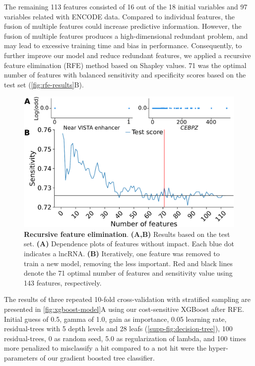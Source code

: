 The remaining 113 features consisted of 16 out of the 18 initial variables\autocite{liu_2017_crispri} and 97 variables related with ENCODE data. Compared to individual features, the fusion of multiple features could increase predictive information. However, the fusion of multiple features produces a high-dimensional redundant problem, and may lead to excessive training time and bias in performance.\autocite{franklin_2005,altman_2018_curse} Consequently, to further improve our model and reduce redundant features, we applied a recursive feature elimination (RFE) method based on Shapley values.\autocite{shapley_SHAP_values} 71 was the optimal number of features with balanced sensitivity and specificity scores based on the test set (\autoref{fig:rfe-results}B). 

\begin{figure}[ht!]
  \centering
  \includegraphics[scale=0.4]{plots/results/ml/rfe.not.important.features.pdf}
  \caption[Recursive feature elimination]{\textbf{Recursive feature elimination}. \textbf{(A,B)} Results based on the test set. \textbf{(A)} Dependence plots of features without impact. Each blue dot indicates a lncRNA. \textbf{(B)} Iteratively, one feature was removed to train a new model, removing the less important. Red and black lines denote the 71 optimal number of features and sensitivity value using 143 features, respectively.}
  \label{fig:rfe-results}
\end{figure}

The results of three repeated 10-fold cross-validation with stratified sampling are presented in \autoref{fig:xgboost-model}A using our cost-sensitive XGBoost after RFE. Initial guess of 0.5, gamma of 1.0, gain as importance, 0.05 learning rate, residual-trees with 5 depth levels and 28 leafs (\autoref{supp-fig:decision-tree}), 100 residual-trees, 0 as random seed, 5.0 as regularization of lambda, and 100 times more penalized to misclassify a hit compared to a not hit were the hyper-parameters of our gradient boosted tree classifier. 

